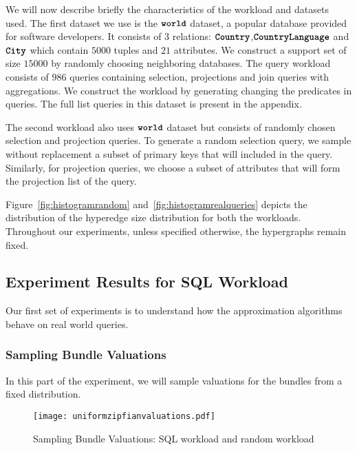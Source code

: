 We will now describe briefly the characteristics of the workload and datasets used. The first dataset we use is the $\texttt{\bfseries world}$ dataset, a popular database provided for software developers. 
It consists of $3$ relations: $\texttt{\bfseries Country}$,$\texttt{\bfseries CountryLanguage}$ and $\texttt{\bfseries City}$ which contain $5000$ tuples and $21$ attributes. We construct a support set of size $15000$ by randomly choosing neighboring databases. 
The query workload consists of $986$ queries containing selection, projections and join queries with aggregations. We construct the workload by generating changing the predicates in queries. The full list queries in this dataset is present in the appendix.

The second workload also uses $\texttt{\bfseries world}$ dataset but consists of randomly chosen selection and projection queries. To generate a random selection query, we  sample without replacement a subset of primary keys that will included in the query. Similarly, for projection queries, we choose a subset of attributes that will form the projection list of the query.

Figure~\ref{fig:histogramrandom} and~\ref{fig:histogramrealqueries} depicts the distribution of the hyperedge size distribution for both the workloads. Throughout our experiments, unless specified otherwise, the hypergraphs remain fixed.


\subsection{Experiment Results for SQL Workload}

Our first set of experiments is to understand how the approximation algorithms behave on real world queries. 


\subsubsection{Sampling Bundle Valuations} 
In this part of the experiment, we will sample valuations for the bundles from a fixed distribution.

\begin{figure}[!t]
	\centering
	\texttt{[image: uniformzipfianvaluations.pdf]}
	\caption{Sampling Bundle Valuations: SQL workload and random workload} \label{fig:unifzipfian}
\end{figure}  


